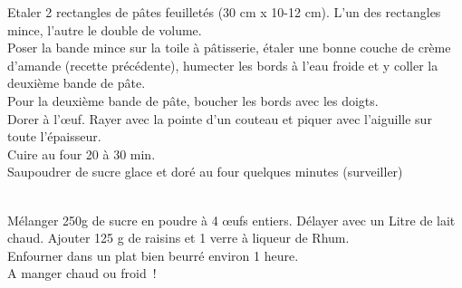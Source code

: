 \begin{minipage}[c]{\textwidth}
Etaler 2 rectangles de pâtes feuilletés (30 cm x 10-12 cm). L’un des rectangles mince, l’autre le double de volume.\\
Poser la bande mince sur la toile à pâtisserie, étaler une bonne couche de crème d’amande (recette précédente), humecter les bords à l’eau froide et y coller la deuxième bande de pâte. \\
Pour la deuxième bande de pâte, boucher les bords avec les doigts. \\
Dorer à l’œuf. Rayer avec la pointe d’un couteau et piquer avec l’aiguille sur toute l’épaisseur. \\
Cuire au four 20 à 30 min.\\
Saupoudrer de sucre glace et doré au four quelques minutes (surveiller)\\
\\

\end{minipage}

\begin{minipage}[c]{\textwidth}
Mélanger 250g de sucre en poudre à 4 œufs entiers. Délayer avec un Litre de lait chaud.  Ajouter 125 g de raisins et 1 verre à liqueur de Rhum. \\
Enfourner dans un plat bien beurré environ 1 heure. \\
A manger chaud ou froid !\\
\\

\end{minipage}

